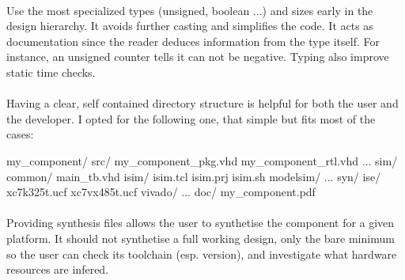 \documentclass[12pt]{article}
\begin{document}

\paragraph{}
Use the most specialized types (unsigned, boolean ...) and sizes
early in the design hierarchy. It avoids further casting and
simplifies the code. It acts as documentation since the reader
deduces information from the type itself. For instance, an
unsigned counter tells it can not be negative. Typing also
improve static time checks.



\paragraph{}
Having a clear, self contained directory structure is helpful
for both the user and the developer. I opted for the following
one, that simple but fits most of the cases:
\begin{sh}
my_component/
 src/
  my_component_pkg.vhd
  my_component_rtl.vhd
  ...
 sim/
  common/
   main_tb.vhd
  isim/
   isim.tcl
   isim.prj
   isim.sh
  modelsim/
   ...
 syn/
  ise/
   xc7k325t.ucf
   xc7vx485t.ucf
  vivado/
   ...
 doc/
  my_component.pdf
\end{sh}

\paragraph{}
Providing synthesis files allows the user to synthetise the
component for a given platform. It should not synthetise a full
working design, only the bare minimum so the user can check its
toolchain (esp. version), and investigate what hardware resources
are infered.




\todo{}
\end{document}

